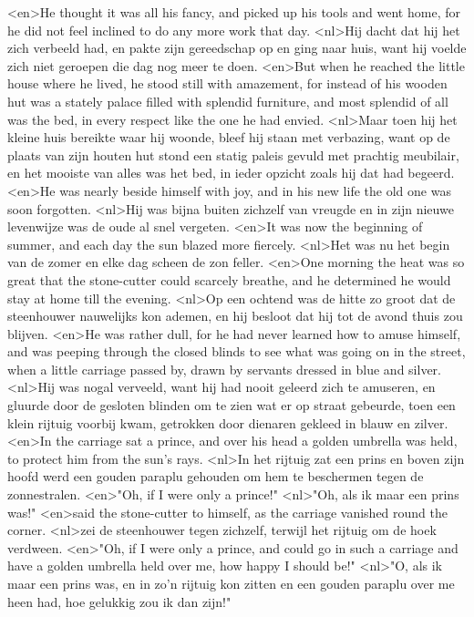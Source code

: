 <en>He thought it was all his fancy, and picked up his tools and went home, for he did not feel inclined to do any more work that day.
<nl>Hij dacht dat hij het zich verbeeld had, en pakte zijn gereedschap op en ging naar huis, want hij voelde zich niet geroepen die dag nog meer te doen.
<en>But when he reached the little house where he lived, he stood still with amazement, for instead of his wooden hut was a stately palace filled with splendid furniture, and most splendid of all was the bed, in every respect like the one he had envied.
<nl>Maar toen hij het kleine huis bereikte waar hij woonde, bleef hij staan met verbazing, want op de plaats van zijn houten hut stond een statig paleis gevuld met prachtig meubilair, en het mooiste van alles was het bed, in ieder opzicht zoals hij dat had begeerd.
<en>He was nearly beside himself with joy, and in his new life the old one was soon forgotten.
<nl>Hij was bijna buiten zichzelf van vreugde en in zijn nieuwe levenwijze was de oude al snel vergeten.
<en>It was now the beginning of summer, and each day the sun blazed more fiercely.
<nl>Het was nu het begin van de zomer en elke dag scheen de zon feller.
<en>One morning the heat was so great that the stone-cutter could scarcely breathe, and he determined he would stay at home till the evening.
<nl>Op een ochtend was de hitte zo groot dat de steenhouwer nauwelijks kon ademen, en hij besloot dat hij tot de avond thuis zou blijven.
<en>He was rather dull, for he had never learned how to amuse himself, and was peeping through the closed blinds to see what was going on in the street, when a little carriage passed by, drawn by servants dressed in blue and silver.
<nl>Hij was nogal verveeld, want hij had nooit geleerd zich te amuseren, en gluurde door de gesloten blinden om te zien wat er op straat gebeurde, toen een klein rijtuig voorbij kwam, getrokken door dienaren gekleed in blauw en zilver.
<en>In the carriage sat a prince, and over his head a golden umbrella was held, to protect him from the sun’s rays.
<nl>In het rijtuig zat een prins en boven zijn hoofd werd een gouden paraplu gehouden om hem te beschermen tegen de zonnestralen.
<en>"Oh, if I were only a prince!"
<nl>"Oh, als ik maar een prins was!"
<en>said the stone-cutter to himself, as the carriage vanished round the corner.
<nl>zei de steenhouwer tegen zichzelf, terwijl het rijtuig om de hoek verdween.
<en>"Oh, if I were only a prince, and could go in such a carriage and have a golden umbrella held over me, how happy I should be!"
<nl>"O, als ik maar een prins was, en in zo'n rijtuig kon zitten en een gouden paraplu over me heen had, hoe gelukkig zou ik dan zijn!"
